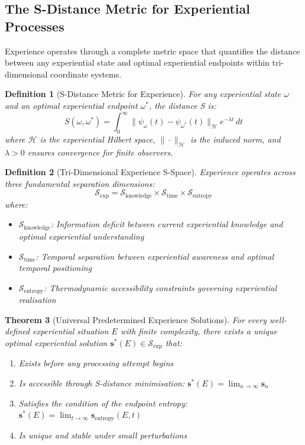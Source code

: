 \documentclass{article}
\newtheorem{theorem}{Theorem}[section]
\newtheorem{definition}[theorem]{Definition}
\begin{document}
\subsection{The S-Distance Metric for Experiential Processes}

Experience operates through a complete metric space that quantifies the distance between any experiential state and optimal experiential endpoints within tri-dimensional coordinate systems.

\begin{definition}[S-Distance Metric for Experience]
For any experiential state $\omega$ and an optimal experiential endpoint $\omega^*$, the distance S is:
\begin{equation}
S(\omega, \omega^*) = \int_0^{\infty} \|\psi_\omega(t) - \psi_{\omega^*}(t)\|_{\mathcal{H}} e^{-\lambda t} \, dt
\end{equation}
where $\mathcal{H}$ is the experiential Hilbert space, $\|\cdot\|_{\mathcal{H}}$ is the induced norm, and $\lambda > 0$ ensures convergence for finite observers.
\end{definition}

\begin{definition}[Tri-Dimensional Experience S-Space]
Experience operates across three fundamental separation dimensions:
\begin{equation}
\mathcal{S}_{\text{exp}} = \mathcal{S}_{\text{knowledge}} \times \mathcal{S}_{\text{time}} \times \mathcal{S}_{\text{entropy}}
\end{equation}
where:
\begin{itemize}
\item $\mathcal{S}_{\text{knowledge}}$: Information deficit between current experiential knowledge and optimal experiential understanding
\item $\mathcal{S}_{\text{time}}$: Temporal separation between experiential awareness and optimal temporal positioning
\item $\mathcal{S}_{\text{entropy}}$: Thermodynamic accessibility constraints governing experiential realisation
\end{itemize}
\end{definition}

\begin{theorem}[Universal Predetermined Experience Solutions]
\label{thm:predetermined_experience_solutions}
For every well-defined experiential situation $E$ with finite complexity, there exists a unique optimal experiential solution $\mathbf{s}^*(E) \in \mathcal{S}_{\text{exp}}$ that:
\begin{enumerate}
\item Exists before any processing attempt begins
\item Is accessible through S-distance minimisation: $\mathbf{s}^*(E) = \lim_{n \to \infty} \mathbf{s}_n$
\item Satisfies the condition of the endpoint entropy: $\mathbf{s}^*(E) = \lim_{t \to \infty} \mathbf{s}_{\text{entropy}}(E, t)$
\item Is unique and stable under small perturbations
\end{enumerate}
\end{theorem}
\end{document}
